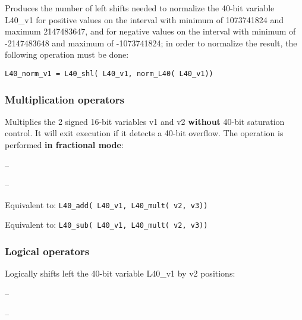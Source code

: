 Produces the number of left shifts needed to normalize the 40-bit
variable L40\_v1 for positive values on the interval with minimum
of 1073741824 and maximum 2147483647, and for negative values on
the interval with minimum of -2147483648 and maximum of
-1073741824; in order to normalize the result, the following
operation must be done:

{\tt L40\_norm\_v1 = L40\_shl( L40\_v1, norm\_L40( L40\_v1))}

\subsubsection{Multiplication operators}


Multiplies the 2 signed 16-bit variables v1 and v2 \textbf{without}
40-bit saturation control.  It will exit execution if it detects a 40-bit
overflow. The operation is performed \textbf{in fractional mode}:

 -- 

 -- 


Equivalent to: {\tt L40\_add( L40\_v1, L40\_mult( v2, v3)) }


Equivalent to: {\tt L40\_sub( L40\_v1, L40\_mult( v2, v3)) }

\subsubsection{Logical operators}


Logically shifts left the 40-bit variable L40\_v1 by v2 positions:

 -- 

 -- 

